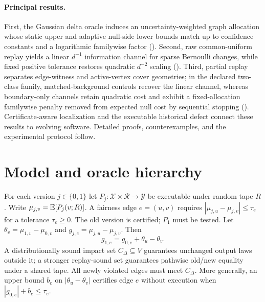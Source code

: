 \paragraph{Principal results.} First, the Gaussian delta oracle induces an uncertainty-weighted graph allocation whose static upper and adaptive null-side lower bounds match up to confidence constants and a logarithmic familywise factor (). Second, raw common-uniform replay yields a linear $d^{-1}$ information channel for sparse Bernoulli changes, while fixed positive tolerance restores quadratic $d^{-2}$ scaling (). Third, partial replay separates edge-witness and active-vertex cover geometries; in the declared two-class family, matched-background controls recover the linear channel, whereas boundary-only channels retain quadratic cost and exhibit a fixed-allocation familywise penalty removed from expected null cost by sequential stopping (). Certificate-aware localization and the executable historical defect connect these results to evolving software. Detailed proofs, counterexamples, and the experimental protocol follow.



\section{Model and oracle hierarchy}
For each version $j\in\{0,1\}$ let $P_j:\mathcal X\times\mathcal R\to\mathcal Y$ be executable under random tape $R$. Write $\mu_{j,v}=\mathbb{E}[P_j(v;R)]$. A fairness edge $e=(u,v)$ requires $|\mu_{j,u}-\mu_{j,v}|\le\tau_e$ for a tolerance $\tau_e\ge0$. The old version is certified; $P_1$ must be tested. Let $\theta_v=\mu_{1,v}-\mu_{0,v}$ and $g_{j,e}=\mu_{j,u}-\mu_{j,v}$. Then
\begin{equation}\label{eq:change-identity}
g_{1,e}=g_{0,e}+\theta_u-\theta_v.
\end{equation}
A distributionally sound impact set $C_\Delta\subseteq V$ guarantees unchanged output laws outside it; a stronger replay-sound set guarantees pathwise old/new equality under a shared tape. All newly violated edges must meet $C_\Delta$. More generally, an upper bound $b_e$ on $|\theta_u-\theta_v|$ certifies edge $e$ without execution when $|g_{0,e}|+b_e\le\tau_e$.

